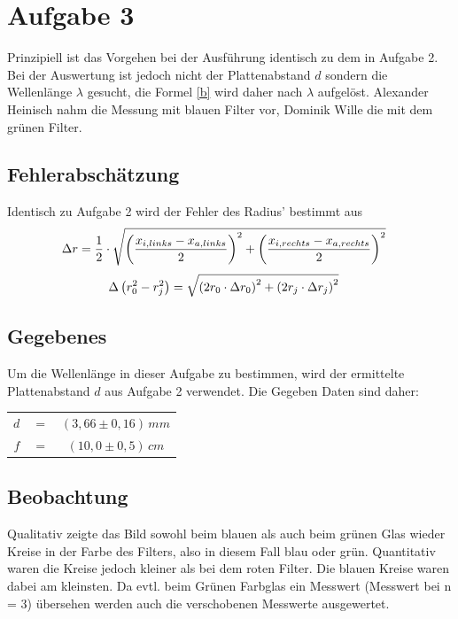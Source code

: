 \section{Aufgabe 3}
Prinzipiell ist das Vorgehen bei der Ausführung identisch zu dem in Aufgabe 2. Bei der Auswertung ist jedoch nicht der Plattenabstand \(d\) sondern die Wellenlänge \(\lambda \) gesucht, die Formel \eqref{b} wird daher nach \(\lambda \) aufgelöst. Alexander Heinisch nahm die Messung mit blauen Filter vor, Dominik Wille die mit dem grünen Filter.
\subsection{Fehlerabschätzung}
Identisch zu Aufgabe 2 wird der Fehler des Radius' bestimmt aus
\begin{align}
\Delta r &= \frac{1}{2} \cdot \sqrt{
\left( \frac{x_{i,links} - x_{a,links}}{2} \right)^2 +
\left( \frac{x_{i,rechts} - x_{a,rechts}}{2} \right)^2
} \notag
\end{align}
\begin{align}
\Delta \left( r_0^2 - r_j^2 \right) &= \sqrt{
\left( 2 r_0 \cdot \Delta r_0 \right)^2 +
\left( 2 r_j \cdot \Delta r_j \right)^2
} \notag
\end{align}
\subsection{Gegebenes}
Um die Wellenlänge in dieser Aufgabe zu bestimmen, wird der ermittelte Plattenabstand \(d\) aus Aufgabe 2 verwendet. Die Gegeben Daten sind daher:
\begin{center}
\begin{tabular}{rcc}
\(d\) & \(=\) & \(\left( 3,66 \pm 0,16 \right)\, mm\) \\
\(f\) & \(=\) & \(\left( 10,0 \pm 0,5 \right)\, cm\) \\
\end{tabular}
\end{center}
\subsection{Beobachtung}
Qualitativ zeigte das Bild sowohl beim blauen als auch beim grünen Glas wieder Kreise in der Farbe des Filters, also in diesem Fall blau oder grün. Quantitativ waren die Kreise jedoch kleiner als bei dem roten Filter. Die blauen Kreise waren dabei am kleinsten. Da evtl. beim Grünen Farbglas ein Messwert (Messwert bei n = 3) übersehen werden auch die verschobenen Messwerte ausgewertet.

